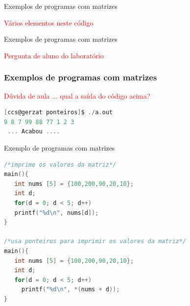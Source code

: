 \begin{frame}{Exemplos de programas com matrizes}





\pause
\textcolor{red}{Vários elementos neste código}

\end{frame}


\begin{frame}{Exemplos de programas com matrizes}




\pause
\textcolor{red}{Pergunta de aluno do  laboratório}

\end{frame}



\begin{frame}

\frametitle{Exemplos de programas com matrizes}


\textcolor{red}{Dúvida de aula ... qual a saída do código acima?}

\pause

\begin{lstlisting}[language=C]
[ccs@gerzat ponteiros]$ ./a.out 
9 8 7 99 88 77 1 2 3 
 ... Acabou ....
\end{lstlisting}

\end{frame}





\begin{frame}{Exemplo de programas com matrizes}
\begin{lstlisting}[language=C]
/*imprime os valores da matriz*/
main(){
   int nums [5] = {100,200,90,20,10};
   int d;
   for(d = 0; d < 5; d++)
   printf("%d\n", nums[d]);
}

/*usa ponteiros para imprimir os valores da matriz*/
main(){
   int nums [5] = {100,200,90,20,10};
   int d;
   for(d = 0; d < 5; d++)
     printf("%d\n", *(nums + d));
}
\end{lstlisting}
\end{frame}

